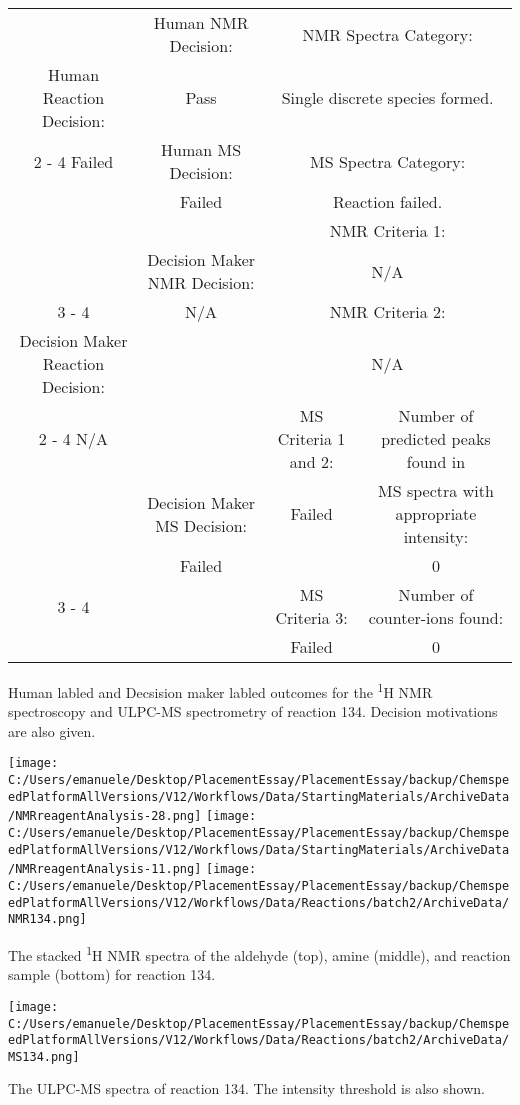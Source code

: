 \documentclass{article}%
\begin{document}
\begin{Decision Table}[H]%
\begin{tabular}{|c|c|c|c|}%
\hline%
&Human NMR Decision:&\multicolumn{2}{|c|}{NMR Spectra Category:}\\%
Human Reaction Decision:&Pass&\multicolumn{2}{|c|}{Single discrete species formed.}\\%
\cline{2%
-%
4}%
Failed&Human MS Decision:&\multicolumn{2}{|c|}{MS Spectra Category:}\\%
&Failed&\multicolumn{2}{|c|}{Reaction failed.}\\%
\hline%
&&\multicolumn{2}{|c|}{NMR Criteria 1:}\\%
&Decision Maker NMR Decision:&\multicolumn{2}{|c|}{N/A}\\%
\cline{3%
-%
4}%
&N/A&\multicolumn{2}{|c|}{NMR Criteria 2:}\\%
Decision Maker Reaction Decision:&&\multicolumn{2}{|c|}{N/A}\\%
\cline{2%
-%
4}%
N/A&&MS Criteria 1 and 2:&Number of predicted peaks found in\\%
&Decision Maker MS Decision:&Failed&MS spectra with appropriate intensity:\\%
&Failed&&0\\%
\cline{3%
-%
4}%
&&MS Criteria 3:&Number of counter{-}ions found:\\%
&&Failed&0\\%
\hline%
\end{tabular}%
\caption{Human labled and Decsision maker labled outcomes for the \textsuperscript{1}H NMR spectroscopy and ULPC-MS spectrometry of reaction 134. Decision motivations are also given.}%
\end{Decision Table}%
\begin{NMR Spectra}[H]%
\begin{center}%
\texttt{[image: C:/Users/emanuele/Desktop/PlacementEssay/PlacementEssay/backup/ChemspeedPlatformAllVersions/V12/Workflows/Data/StartingMaterials/ArchiveData/NMRreagentAnalysis-28.png]}\hfill%
\texttt{[image: C:/Users/emanuele/Desktop/PlacementEssay/PlacementEssay/backup/ChemspeedPlatformAllVersions/V12/Workflows/Data/StartingMaterials/ArchiveData/NMRreagentAnalysis-11.png]}\hfill%
\texttt{[image: C:/Users/emanuele/Desktop/PlacementEssay/PlacementEssay/backup/ChemspeedPlatformAllVersions/V12/Workflows/Data/Reactions/batch2/ArchiveData/NMR134.png]}\hfill%
\end{center}%
\caption{The stacked \textsuperscript{1}H NMR spectra of the aldehyde (top), amine (middle), and reaction sample (bottom) for reaction 134.}%
\end{NMR Spectra}%
\begin{MS Spectra}[H]%
\begin{center}%
\texttt{[image: C:/Users/emanuele/Desktop/PlacementEssay/PlacementEssay/backup/ChemspeedPlatformAllVersions/V12/Workflows/Data/Reactions/batch2/ArchiveData/MS134.png]}\hfill%
\end{center}%
\caption{The ULPC-MS spectra of reaction 134. The intensity threshold is also shown.}%
\end{MS Spectra}%
\end{document}
